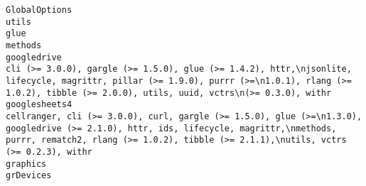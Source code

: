 \documentclass[
  letterpaper,
  DIV=11,
  numbers=noendperiod]{scrreprt}
\begin{document}
\begin{verbatim}
GlobalOptions                                                                                                                                                                                                                                                                                                                                                                                                                                                                                                                                                                                                        utils
glue                                                                                                                                                                                                                                                                                                                                                                                                                                                                                                                                                                                                               methods
googledrive                                                                                                                                                                                                                                                                                                                                                                                                     cli (>= 3.0.0), gargle (>= 1.5.0), glue (>= 1.4.2), httr,\njsonlite, lifecycle, magrittr, pillar (>= 1.9.0), purrr (>=\n1.0.1), rlang (>= 1.0.2), tibble (>= 2.0.0), utils, uuid, vctrs\n(>= 0.3.0), withr
googlesheets4                                                                                                                                                                                                                                                                                                                                                                               cellranger, cli (>= 3.0.0), curl, gargle (>= 1.5.0), glue (>=\n1.3.0), googledrive (>= 2.1.0), httr, ids, lifecycle, magrittr,\nmethods, purrr, rematch2, rlang (>= 1.0.2), tibble (>= 2.1.1),\nutils, vctrs (>= 0.2.3), withr
graphics                                                                                                                                                                                                                                                                                                                                                                                                                                                                                                                                                                                                         grDevices

\end{verbatim}
\end{document}
